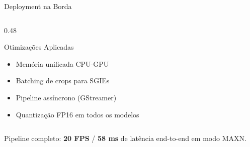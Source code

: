 \begin{frame}{Deployment na Borda}
\begin{columns}[t]
\begin{column}{0.48\textwidth}
      \begin{block}{\scriptsize Otimizações Aplicadas}
        \begin{itemize}\scriptsize
          \setlength{\itemsep}{0pt}
          \item Memória unificada CPU-GPU
          \item Batching de crops para SGIEs
          \item Pipeline assíncrono (GStreamer)
          \item Quantização FP16 em todos os modelos
        \end{itemize}
      \end{block}
    \end{column}
  \end{columns}

  \vfill

  \begin{center}
    \scriptsize
    \textcolor{labelcolor}{Pipeline completo: \textbf{20 FPS} / \textbf{58 ms} de latência end-to-end em modo MAXN.}
  \end{center}
  \vfill
\end{frame}
